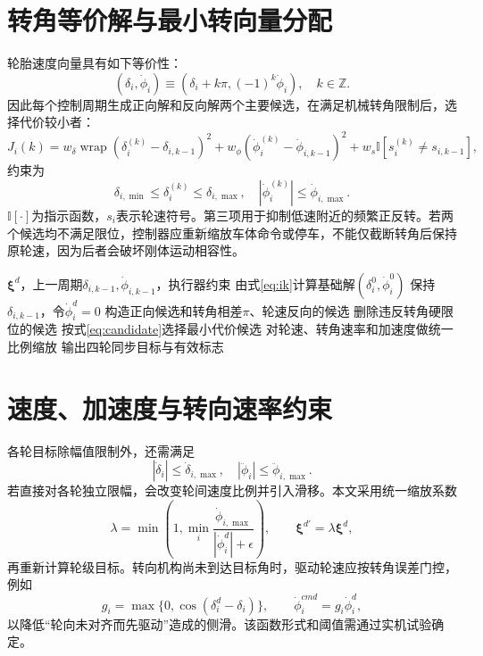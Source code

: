 \documentclass[UTF8,openany,12pt,a4paper]{ctexrep}
\begin{document}
\section{转角等价解与最小转向量分配}
轮胎速度向量具有如下等价性：
\begin{equation}(\delta_i,\dot\phi_i)\equiv(\delta_i+k\pi,(-1)^k\dot\phi_i),\quad k\in\mathbb Z.\end{equation}
因此每个控制周期生成正向解和反向解两个主要候选，在满足机械转角限制后，选择代价较小者：
\begin{equation}
J_i(k)=w_\delta\operatorname{wrap}(\delta_i^{(k)}-\delta_{i,k-1})^2
+w_\phi(\dot\phi_i^{(k)}-\dot\phi_{i,k-1})^2
+w_s\mathbb I[s_i^{(k)}\neq s_{i,k-1}],
\label{eq:candidate}
\end{equation}
约束为
\begin{equation}
\delta_{i,\min}\leq\delta_i^{(k)}\leq\delta_{i,\max},\quad
|\dot\phi_i^{(k)}|\leq\dot\phi_{i,\max}.
\end{equation}
$\mathbb I[\cdot]$为指示函数，$s_i$表示轮速符号。第三项用于抑制低速附近的频繁正反转。若两个候选均不满足限位，控制器应重新缩放车体命令或停车，不能仅截断转角后保持原轮速，因为后者会破坏刚体运动相容性。

\begin{algorithm}[H]
\caption{有限转角条件下的轮级指令分配}\label{alg:allocation}
\begin{algorithmic}[1]
\Require $\bm\xi^d$，上一周期$\delta_{i,k-1},\dot\phi_{i,k-1}$，执行器约束
  \State 由式\eqref{eq:ik}计算基础解$(\delta_i^0,\dot\phi_i^0)$
    \State 保持$\delta_{i,k-1}$，令$\dot\phi_i^d=0$
  \Else
    \State 构造正向候选和转角相差$\pi$、轮速反向的候选
    \State 删除违反转角硬限位的候选
    \State 按式\eqref{eq:candidate}选择最小代价候选
  \EndIf
\EndFor
\State 对轮速、转角速率和加速度做统一比例缩放
\State 输出四轮同步目标与有效标志
\end{algorithmic}
\end{algorithm}

\section{速度、加速度与转向速率约束}
各轮目标除幅值限制外，还需满足
\begin{equation}|\dot\delta_i|\leq\dot\delta_{i,\max},\quad |\ddot\phi_i|\leq\ddot\phi_{i,\max}.\end{equation}
若直接对各轮独立限幅，会改变轮间速度比例并引入滑移。本文采用统一缩放系数
\begin{equation}
\lambda=\min\left(1,\min_i\frac{\dot\phi_{i,\max}}{|\dot\phi_i^d|+\epsilon}\right),
\qquad \bm\xi^{d\prime}=\lambda\bm\xi^d,
\end{equation}
再重新计算轮级目标。转向机构尚未到达目标角时，驱动轮速应按转角误差门控，例如
\begin{equation}
g_i=\max\{0,\cos(\delta_i^d-\delta_i)\},\qquad \dot\phi_i^{cmd}=g_i\dot\phi_i^d,
\end{equation}
以降低“轮向未对齐而先驱动”造成的侧滑。该函数形式和阈值需通过实机试验确定。
\end{document}
